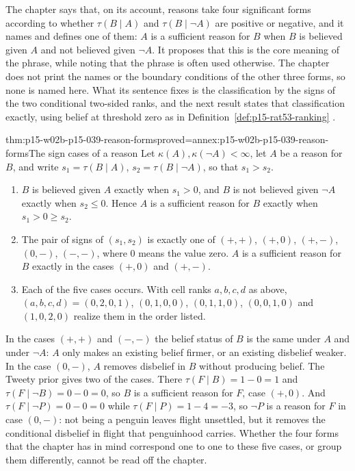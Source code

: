 The chapter says that, on its account, reasons take four significant forms
according to whether \(\tau(B\mid A)\) and \(\tau(B\mid\neg A)\) are
positive or negative, and it names and defines one of them: \(A\) is a
sufficient reason for \(B\) when \(B\) is believed given \(A\) and not
believed given \(\neg A\).  It proposes that this is the core meaning of
the phrase, while noting that the phrase is often used otherwise.  The
chapter does not print the names or the boundary conditions of the other
three forms, so none is named here.  What its sentence fixes is the
classification by the signs of the two conditional two-sided ranks, and the
next result states that classification exactly, using belief at threshold
zero as in Definition~\ref{def:p15-rat53-ranking}
\parencite[p.~340]{KernIsbernerSkovgaardOlsenSpohn2021Ranking}.

\begin{hbtheorem}{thm:p15-w02b-p15-039-reason-forms}{proved=annex:p15-w02b-p15-039-reason-forms}{The sign cases of a reason}
Let \(\kappa(A),\kappa(\neg A)<\infty\), let \(A\) be a reason for \(B\),
and write \(s_1=\tau(B\mid A)\), \(s_2=\tau(B\mid\neg A)\), so that
\(s_1>s_2\).
\begin{enumerate}
\item \(B\) is believed given \(A\) exactly when \(s_1>0\), and \(B\) is
 not believed given \(\neg A\) exactly when \(s_2\leq0\).  Hence \(A\) is a
 sufficient reason for \(B\) exactly when \(s_1>0\geq s_2\).
\item The pair of signs of \((s_1,s_2)\) is exactly one of
 \((+,+)\), \((+,0)\), \((+,-)\), \((0,-)\), \((-,-)\), where \(0\) means
 the value zero.  \(A\) is a sufficient reason for \(B\) exactly in the
 cases \((+,0)\) and \((+,-)\).
\item Each of the five cases occurs.  With cell ranks \(a,b,c,d\) as above,
 \((a,b,c,d)=(0,2,0,1)\), \((0,1,0,0)\), \((0,1,1,0)\), \((0,0,1,0)\) and
 \((1,0,2,0)\) realize them in the order listed.
\end{enumerate}
\end{hbtheorem}

In the cases \((+,+)\) and \((-,-)\) the belief status of \(B\) is the same
under \(A\) and under \(\neg A\): \(A\) only makes an existing belief firmer,
or an existing disbelief weaker.  In the case \((0,-)\), \(A\) removes
disbelief in \(B\) without producing belief.  The Tweety prior gives two of
the cases.  There \(\tau(F\mid B)=1-0=1\) and \(\tau(F\mid\neg B)=0-0=0\),
so \(B\) is a sufficient reason for \(F\), case \((+,0)\).  And
\(\tau(F\mid\neg P)=0-0=0\) while \(\tau(F\mid P)=1-4=-3\), so \(\neg P\)
is a reason for \(F\) in case \((0,-)\): not being a penguin leaves flight
unsettled, but it removes the conditional disbelief in flight that
penguinhood carries.  Whether the four forms that the chapter has in mind
correspond one to one to these five cases, or group them differently, cannot
be read off the chapter.

